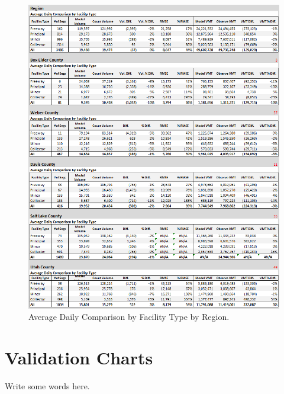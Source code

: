 \documentclass[
  letterpaper,
  DIV=11,
  numbers=noendperiod]{scrreprt}
\begin{document}
\begin{figure}[H]

{\centering \includegraphics{v9x/v900/validation/_pictures/7-plot1.png}

}

\caption{\label{fig-pdf-ave-ft}Average Daily Comparison by Facility Type
by Region.}

\end{figure}

\hypertarget{validation-charts}{%
\section{Validation Charts}\label{validation-charts}}

Write some words here.
\end{document}

